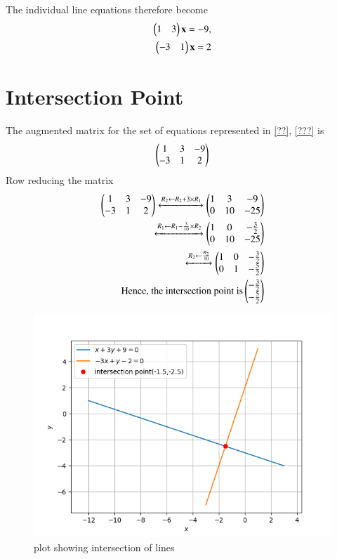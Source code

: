 \documentclass[journal,12pt,twocolumn]{IEEEtran}
\begin{document}
The individual line equations therefore become
\begin{align}
    \begin{pmatrix}1&3\end{pmatrix}\mathbf{x}=-9\label{??} ,\\\begin{pmatrix}-3&1\end{pmatrix}\mathbf{x}=2\label{???}
\end{align}
\section{Intersection Point}
The augmented matrix for the set of equations represented in \ref{??}, \ref{???} is
\begin{align}
\begin{pmatrix}1&3&-9\\-3&1&2\end{pmatrix}
\end{align}
Row reducing the matrix
\begin{align}
 \begin{pmatrix}1&3&-9\\-3&1&2\end{pmatrix}\xleftrightarrow[]{R_2\leftarrow R_2+3\times R_1}\begin{pmatrix}1&3&-9\\0&10&-25\end{pmatrix}\\
 \xleftrightarrow[]{R_1\leftarrow R_1-\frac{3}{10}\times R_2}\begin{pmatrix}1&0&-\frac{3}{2}\\0&10&-25\end{pmatrix}\\
 \xleftrightarrow[]{R_2\leftarrow \frac{R_2}{10}}\begin{pmatrix}1&0&-\frac{3}{2}\\0&1&-\frac{5}{2}\end{pmatrix}\\
\text{Hence, the intersection point is}
\begin{pmatrix}-\frac{3}{2}\\-\frac{5}{2}\end{pmatrix}
\end{align}
\begin{figure}[!ht]
\centering
\includegraphics[width=\columnwidth]{hw4plot.png}
\caption{plot showing intersection of lines}
\label{Fig}
\end{figure}
\newpage
\end{document}
